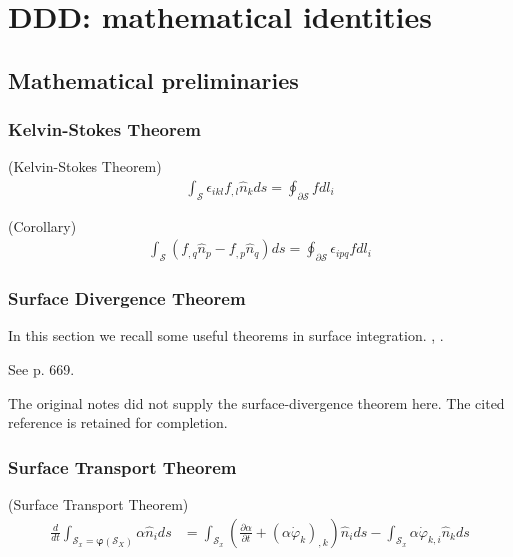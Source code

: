 
\chapter{DDD: mathematical identities}




\section{Mathematical preliminaries}

\subsection{Kelvin-Stokes Theorem}
\begin{mytheorem} (Kelvin-Stokes Theorem)
\begin{align}
\int_\mathcal{S} \epsilon_{ikl}f_{,l}\hat{n}_kds=\oint_{\partial\mathcal{S}} f dl_i
\label{KelvinStokes}
\end{align}
\end{mytheorem}

\begin{mytheorem} (Corollary)
\begin{align}
\int_\mathcal{S} \left(f_{,q}\hat{n}_p-f_{,p}\hat{n}_q\right)ds=\oint_{\partial\mathcal{S}} \epsilon_{ipq}f dl_i
\label{KelvinStokesCorollary}
\end{align}
\end{mytheorem}


\subsection{Surface Divergence Theorem}
In this section we recall some useful theorems in surface integration. \cite{Slattery:2006wn}, \cite{Scovazzi:2007tc}.

See \cite{Slattery:2006wn} p. 669.
\begin{draftnote}The original notes did not supply the surface-divergence theorem here. The cited reference is retained for completion.\end{draftnote}

\subsection{Surface Transport Theorem}

\begin{mytheorem} (Surface Transport Theorem)
\begin{align}
\frac{d}{dt}\int_{\mathcal{S}_x=\bm \varphi (\mathcal{S}_X)}\alpha \hat{n}_ids&=\int_{\mathcal{S}_x}\left(\frac{\partial \alpha}{\partial t}+\left(\alpha \dot \varphi_k\right)_{,k}\right)\hat{n}_ids-\int_{\mathcal{S}_x}\alpha \dot\varphi_{k,i}\hat{n}_kds
\label{STT2}
\end{align}
\end{mytheorem}

